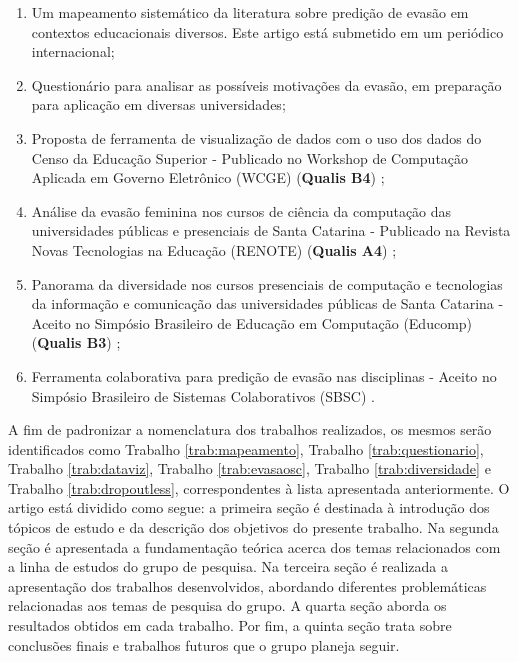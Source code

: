 \documentclass[12pt]{article}
\begin{document}
\begin{enumerate}
    \item \label{trab:mapeamento} Um mapeamento sistemático da literatura sobre predição de evasão em contextos educacionais diversos. Este artigo está submetido em um periódico internacional;
    \item \label{trab:questionario} Questionário para analisar as possíveis motivações da evasão, em preparação para aplicação em diversas universidades;    \item \label{trab:dataviz} Proposta de ferramenta de visualização de dados com o uso dos dados do Censo da Educação Superior - Publicado no Workshop de Computação Aplicada em Governo Eletrônico (WCGE) (\textbf{Qualis B4}) \cite{wcge}; %
    \item \label{trab:evasaosc} Análise da evasão feminina nos cursos de ciência da computação das universidades públicas e presenciais de Santa Catarina - Publicado na Revista Novas Tecnologias na Educação (RENOTE) (\textbf{Qualis A4}) \cite{santos2022analise};%
    \item \label{trab:diversidade} Panorama da diversidade nos cursos presenciais de computação e tecnologias da informação e comunicação das universidades públicas de Santa Catarina - Aceito no Simpósio Brasileiro de Educação em Computação (Educomp)  (\textbf{Qualis B3}) \cite{santos2023panorama}; %
    \item \label{trab:dropoutless} Ferramenta colaborativa para predição de evasão nas disciplinas - Aceito no Simpósio Brasileiro de Sistemas Colaborativos (SBSC) \cite{van2023dropoutless}.
\end{enumerate}

A fim de padronizar a nomenclatura dos trabalhos realizados, os mesmos serão identificados como Trabalho \ref{trab:mapeamento}, Trabalho \ref{trab:questionario}, Trabalho \ref{trab:dataviz}, Trabalho \ref{trab:evasaosc}, Trabalho \ref{trab:diversidade} e Trabalho \ref{trab:dropoutless}, correspondentes à lista apresentada anteriormente. O artigo está dividido como segue: a primeira seção é destinada à introdução dos tópicos de estudo e da descrição dos objetivos do presente trabalho. Na segunda seção é apresentada a fundamentação teórica acerca dos temas relacionados com a linha de estudos do grupo de pesquisa. Na terceira seção é realizada a apresentação dos trabalhos desenvolvidos, abordando diferentes problemáticas relacionadas aos temas de pesquisa do grupo. A quarta seção aborda os resultados obtidos em cada trabalho. Por fim, a quinta seção trata sobre conclusões finais e trabalhos futuros que o grupo planeja seguir.
\end{document}
